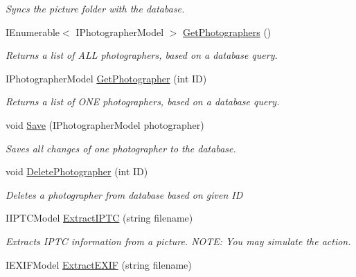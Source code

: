 \begin{DoxyCompactItemize}
\begin{DoxyCompactList}\small\item\em Syncs the picture folder with the database. \end{DoxyCompactList}\item 
I\+Enumerable$<$ I\+Photographer\+Model $>$ \mbox{\hyperlink{class_pic_d_b_1_1_layers_1_1_business_layer_a68396080531045c112648c5fd7da390d}{Get\+Photographers}} ()
\begin{DoxyCompactList}\small\item\em Returns a list of A\+LL photographers, based on a database query. \end{DoxyCompactList}\item 
I\+Photographer\+Model \mbox{\hyperlink{class_pic_d_b_1_1_layers_1_1_business_layer_aa6bf6cde8a4622a0f6f999d826674abb}{Get\+Photographer}} (int ID)
\begin{DoxyCompactList}\small\item\em Returns a list of O\+NE photographers, based on a database query. \end{DoxyCompactList}\item 
void \mbox{\hyperlink{class_pic_d_b_1_1_layers_1_1_business_layer_a480f62efec10414b2e387200b9da9682}{Save}} (I\+Photographer\+Model photographer)
\begin{DoxyCompactList}\small\item\em Saves all changes of one photographer to the database. \end{DoxyCompactList}\item 
void \mbox{\hyperlink{class_pic_d_b_1_1_layers_1_1_business_layer_a82e16df4dd3334120f09d9c60c229acd}{Delete\+Photographer}} (int ID)
\begin{DoxyCompactList}\small\item\em Deletes a photographer from database based on given ID \end{DoxyCompactList}\item 
I\+I\+P\+T\+C\+Model \mbox{\hyperlink{class_pic_d_b_1_1_layers_1_1_business_layer_a208feabb41bd4f7518208df696ccc9e5}{Extract\+I\+P\+TC}} (string filename)
\begin{DoxyCompactList}\small\item\em Extracts I\+P\+TC information from a picture. N\+O\+TE\+: You may simulate the action. \end{DoxyCompactList}\item 
I\+E\+X\+I\+F\+Model \mbox{\hyperlink{class_pic_d_b_1_1_layers_1_1_business_layer_aa6e80066866a071f5801fa73138326e3}{Extract\+E\+X\+IF}} (string filename)

\end{DoxyCompactItemize}
